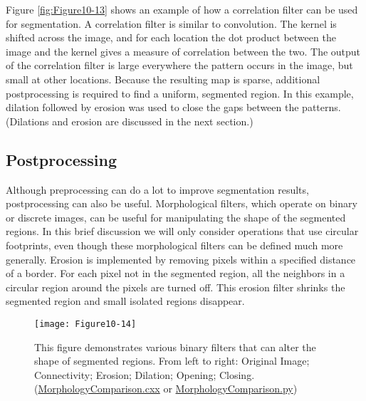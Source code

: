 Figure \ref{fig:Figure10-13} shows an example of how a correlation filter can be used for segmentation. A correlation filter is similar to convolution. The kernel is shifted across the image, and for each location the dot product between the image and the kernel gives a measure of correlation between the two. The output of the correlation filter is large everywhere the pattern occurs in the image, but small at other locations. Because the resulting map is sparse, additional postprocessing is required to find a uniform, segmented region. In this example, dilation followed by erosion was used to close the gaps between the patterns. (Dilations and erosion are discussed in the next section.)

\subsection{Postprocessing}

Although preprocessing can do a lot to improve segmentation results, postprocessing can also be useful. Morphological filters, which operate on binary or discrete images, can be useful for manipulating the shape of the segmented regions. In this brief discussion we will only consider operations that use circular footprints, even though these morphological filters can be defined much more generally. Erosion is implemented by removing pixels within a specified distance of a border. For each pixel not in the segmented region, all the neighbors in a circular region around the pixels are turned off. This erosion filter shrinks the segmented region and small isolated regions disappear.

\begin{figure}[!htb]
	\centering
	\texttt{[image: Figure10-14]}
	\caption{This figure demonstrates various binary filters that can alter the shape of segmented regions. From left to right: Original Image; Connectivity; Erosion; Dilation; Opening; Closing. (\href{https://lorensen.github.io/VTKExamples/site/Cxx/ImageProcessing/MorphologyComparison/}{MorphologyComparison.cxx} or \href{https://lorensen.github.io/VTKExamples/site/Python/ImageProcessing/MorphologyComparison/}{MorphologyComparison.py})}
	\label{fig:Figure10-14}
\end{figure}


